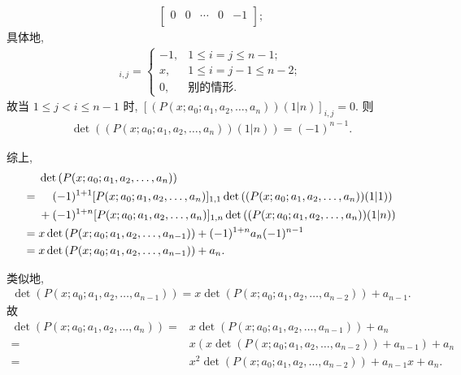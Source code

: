 \documentclass[../libro.tex]{subfiles}
\begin{document}
\begin{example}
\begin{align*}
\begin{bmatrix}
            0      & 0      & \cdots & 0      & -1     \\
        \end{bmatrix};
    \end{align*}
    具体地,
    \begin{align*}
        [(P(x; a_0; a_1, a_2, \dots, a_n))(1|n)]_{i,j} =
        \begin{cases}
            -1, & 1 \leq i = j \leq n-1;     \\
            x,  & 1 \leq i = j - 1 \leq n-2; \\
            0,  & \text{别的情形}.
        \end{cases}
    \end{align*}
    故当 \(1 \leq j < i \leq n-1\) 时,
    \([(P(x; a_0; a_1, a_2, \dots, a_n))(1|n)]_{i,j} = 0\).
    则
    \begin{align*}
        \det {((P(x; a_0; a_1, a_2, \dots, a_n))(1|n))}
        = (-1)^{n-1}.
    \end{align*}

    综上,
    \begin{align*}
        &
        \det {(P(x; a_0; a_1, a_2, \dots, a_n))}
        \\
        = {} &
        \hphantom{{} + {}}
        (-1)^{1+1} [P(x; a_0; a_1, a_2, \dots, a_n)]_{1,1}
        \det {((P(x; a_0; a_1, a_2, \dots, a_n))(1|1))}
        \\
        &
        + (-1)^{1+n} [P(x; a_0; a_1, a_2, \dots, a_n)]_{1,n}
        \det {((P(x; a_0; a_1, a_2, \dots, a_n))(1|n))}
        \\
        = {} &
        x \det {(P(x; a_0; a_1, a_2, \dots, a_{n-1}))}
        + (-1)^{1+n} a_n (-1)^{n-1}
        \\
        = {} &
        x \det {(P(x; a_0; a_1, a_2, \dots, a_{n-1}))} + a_n.
    \end{align*}

    类似地,
    \begin{align*}
        \det {(P(x; a_0; a_1, a_2, \dots, a_{n-1}))}
        = x \det {(P(x; a_0; a_1, a_2, \dots, a_{n-2}))} + a_{n-1}.
    \end{align*}
    故
    \begin{align*}
        \det {(P(x; a_0; a_1, a_2, \dots, a_n))}
        = {} &
        x \det {(P(x; a_0; a_1, a_2, \dots, a_{n-1}))} + a_n
        \\
        = {} &
        x (x \det {(P(x; a_0; a_1, a_2, \dots, a_{n-2}))} + a_{n-1}) + a_n
        \\
        = {} &
        x^2 \det {(P(x; a_0; a_1, a_2, \dots, a_{n-2}))}
        + a_{n-1} x + a_n.
    \end{align*}


\end{example}
\end{document}
